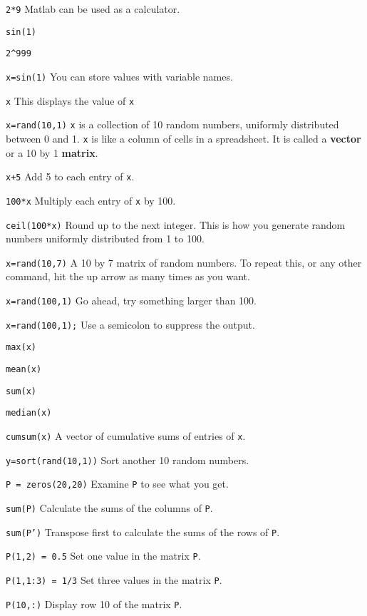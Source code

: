 \blist{-0.05in}
\item {\tt 2*9}       \hfill Matlab can be used as a calculator.
\item {\tt sin(1)}
\item {\tt 2\^{}999}
\item {\tt x=sin(1)}  \hfill You can store values with variable names.
\item {\tt x}         \hfill This displays the value of {\tt x}
\item {\tt x=rand(10,1)} \hfill {\tt x} is a collection of 10 random
numbers, uniformly distributed between 0 and 1.  {\tt x} is like a column
of cells in a spreadsheet.  It is called a {\bf vector} or a 10 by 1 {\bf
matrix}.
\item {\tt x+5}       \hfill Add 5 to each entry of {\tt x}.
\item {\tt 100*x}       \hfill Multiply each entry of {\tt x} by 100.
\item {\tt ceil(100*x)} \hfill Round up to the next integer. This is how you generate \new random numbers uniformly distributed from 1 to 100.
\item {\tt x=rand(10,7)} \hfill A 10 by 7 matrix of random numbers.  To repeat this, or any other command, \new hit the up arrow as many times as you want.
\item {\tt x=rand(100,1)} \hfill Go ahead, try something larger than 100.
\item {\tt x=rand(100,1);} \hfill Use a semicolon to suppress the output.
\item {\tt max(x)} \hfill
\item {\tt mean(x)} \hfill
\item {\tt sum(x)} \hfill
\item {\tt median(x)} \hfill
\item {\tt cumsum(x)} \hfill A vector of cumulative sums of entries of {\tt x}.
\item {\tt y=sort(rand(10,1))} \hfill Sort another 10 random numbers.

\item {\tt P = zeros(20,20)} \hfill Examine {\tt P} to see what you get.
\item {\tt sum(P)} \hfill Calculate the sums of the columns of {\tt P}.
\item {\tt sum(P')} \hfill Transpose first to calculate the sums of the rows of {\tt P}.
\item {\tt P(1,2) = 0.5} \hfill Set one value in the matrix {\tt P}.
\item {\tt P(1,1:3) = 1/3} \hfill Set three values in the matrix {\tt P}.
\item {\tt P(10,:)} \hfill Display row 10 of the matrix {\tt P}.

